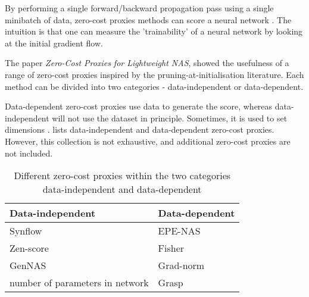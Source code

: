 By performing a single forward/backward propagation pass using a single minibatch of data, zero-cost proxies methods can score a neural network \autocite{akhauri2022evolving}. The intuition is that one can measure the 'trainability' of a neural network by looking at the initial gradient flow. 

The paper \textit{Zero-Cost Proxies for Lightweight NAS}, \autocite{abdelfattah2021zero} showed the usefulness of a range of zero-cost proxies inspired by the pruning-at-initialisation literature. Each method can be divided into two categories - data-independent or data-dependent. 

Data-dependent zero-cost proxies use data to generate the score, whereas data-independent will not use the dataset in principle. Sometimes, it is used to set dimensions \autocite{colin2022adeeperlook}.  lists data-independent and data-dependent zero-cost proxies. However, this collection is not exhaustive, and additional zero-cost proxies are not included. 


\begin{table}[ht]
    \caption{Different zero-cost proxies within the two categories data-independent and data-dependent}
    \centering
    \begin{tabular}{l|l}
    \textbf{Data-independent}         & \textbf{Data-dependent} \\ \hline
    Synflow & EPE-NAS                   \\
    \cellcolor{verylightgray}Zen-score                       & \cellcolor{verylightgray}Fisher                    \\
    GenNAS                          & Grad-norm                 \\
    \cellcolor{verylightgray}number of parameters in network & \cellcolor{verylightgray}Grasp                                 
    \end{tabular}
    \label{tab:zcproxies}
\end{table}


